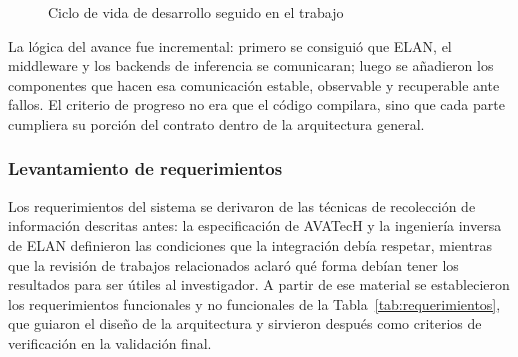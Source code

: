 \documentclass[11pt,a4paper]{article}
\begin{document}
\begin{figure}[H]
\centering
{}
\caption{Ciclo de vida de desarrollo seguido en el trabajo}
\label{fig:ciclo_desarrollo}
\end{figure}

La lógica del avance fue incremental: primero se consiguió que ELAN, el middleware y los backends de inferencia se comunicaran; luego se añadieron los componentes que hacen esa comunicación estable, observable y recuperable ante fallos. El criterio de progreso no era que el código compilara, sino que cada parte cumpliera su porción del contrato dentro de la arquitectura general.

\subsubsection{Levantamiento de requerimientos}

Los requerimientos del sistema se derivaron de las técnicas de recolección de información descritas antes: la especificación de AVATecH y la ingeniería inversa de ELAN definieron las condiciones que la integración debía respetar, mientras que la revisión de trabajos relacionados aclaró qué forma debían tener los resultados para ser útiles al investigador. A partir de ese material se establecieron los requerimientos funcionales y no funcionales de la Tabla~\ref{tab:requerimientos}, que guiaron el diseño de la arquitectura y sirvieron después como criterios de verificación en la validación final.
\end{document}
